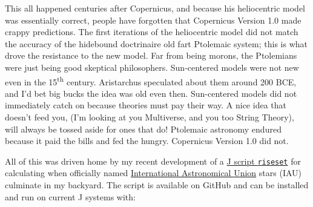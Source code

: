 This all happened centuries after Copernicus, and because his
heliocentric model was essentially correct, people have forgotten that
Copernicus Version 1.0 made crappy predictions. The first iterations of
the heliocentric model did not match the accuracy of the hidebound
doctrinaire old fart Ptolemaic system; this is what drove the resistance
to the new model. Far from being morons, the Ptolemians were just being
good skeptical philosophers. Sun-centered models were not new even in
the 15\textsuperscript{th} century. Aristarchus speculated about them
around 200 BCE, and I'd bet big bucks the idea was old even then.
Sun-centered models did not immediately catch on because theories must
pay their way. A nice idea that doesn't feed you, (I'm looking at you
Multiverse, and you too String Theory), will always be tossed aside for
ones that do! Ptolemaic astronomy endured because it paid the bills and
fed the hungry. Copernicus Version 1.0 did not.

All of this was driven home by my recent development of a
\href{https://github.com/bakerjd99/jackshacks/blob/main/riseset.ijs}{J
script \texttt{riseset}} for calculating when officially named
\href{https://www.iau.org/}{International Astronomical Union} stars
(IAU) culminate in my backyard. The script is available on GitHub and
can be installed and run on current J systems with:

\begin{Shaded}
\begin{Highlighting}[]

\end{Highlighting}
\end{Shaded}

